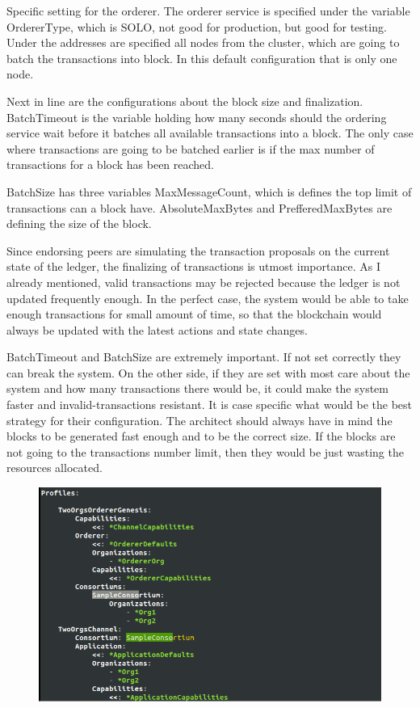 \documentclass[a4paper,11pt]{report}
\begin{document}
Specific setting for the orderer. The orderer service is specified under the variable OrdererType, which is SOLO, not good for production, but good for testing. Under the addresses are specified all nodes from the cluster, which are going to batch the transactions into block. In this default configuration that is only one node.
 
Next in line are the configurations about the block size and finalization. BatchTimeout is the variable holding how many seconds should the ordering service wait before it batches all available transactions into a block. The only case where transactions are going to be batched earlier is if the max number of transactions for a block has been reached.

	BatchSize has three variables MaxMessageCount, which is defines the top limit of transactions can a block have. AbsoluteMaxBytes and PrefferedMaxBytes are defining the size of the block.
	
	Since endorsing peers are simulating the transaction proposals on the current state of the ledger, the finalizing of transactions is utmost importance. As I already mentioned, valid transactions may be rejected because the ledger is not updated frequently enough. In the perfect case, the system would be able to take enough transactions for small amount of time, so that the blockchain would always be updated with the latest actions and state changes. 
	
	BatchTimeout and BatchSize are extremely important. If not set correctly they can break the system. On the other side, if they are set with most care about the system and how many transactions there would be, it could make the system faster and invalid-transactions resistant. It is case specific what would be the best strategy for their configuration. The architect should always have in mind the blocks to be generated fast enough and to be the correct size. If the blocks are not going to the transactions number limit, then they would be just wasting the resources allocated.  


\begin{figure}[h]
\centering
  \includegraphics[width = 16cm]{configtx3.png}
  \caption{}
  \label{dockerEnvironment}
\end{figure}
\end{document}
